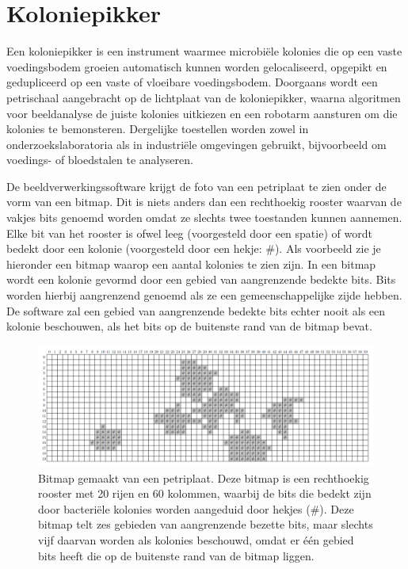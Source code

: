 
\section*{Koloniepikker}
Een koloniepikker is een instrument waarmee microbiële kolonies die op een vaste
voedingsbodem groeien automatisch kunnen worden gelocaliseerd, opgepikt en
gedupliceerd op een vaste of vloeibare voedingsbodem. Doorgaans wordt een
petrischaal aangebracht op de lichtplaat van de koloniepikker, waarna algoritmen
voor beeldanalyse de juiste kolonies uitkiezen en een robotarm aansturen om die
kolonies te bemonsteren. Dergelijke toestellen worden zowel in
onderzoekslaboratoria als in industri\"ele omgevingen gebruikt, bijvoorbeeld om
voedings- of bloedstalen te analyseren.

De beeldverwerkingssoftware krijgt de foto van een petriplaat te zien onder de
vorm van een bitmap. Dit is niets anders dan een rechthoekig rooster waarvan de
vakjes bits genoemd worden omdat ze slechts twee toestanden kunnen aannemen.
Elke bit van het rooster is ofwel leeg (voorgesteld door een spatie) of wordt
bedekt door een kolonie (voorgesteld door een hekje: \#). Als voorbeeld zie je
hieronder een bitmap waarop een aantal kolonies te zien zijn. In een bitmap
wordt een kolonie gevormd door een gebied van aangrenzende bedekte bits. Bits
worden hierbij aangrenzend genoemd als ze een gemeenschappelijke zijde hebben.
De software zal een gebied van aangrenzende bedekte bits echter nooit als een
kolonie beschouwen, als het bits op de buitenste rand van de bitmap bevat.

\begin{figure}[H]
  \begin{center}
    \centerline{\includegraphics[scale=0.30]{koloniepikker/colony_bitmap.png}}
    \caption{Bitmap gemaakt van een petriplaat. Deze bitmap is een rechthoekig
        rooster met 20 rijen en 60 kolommen, waarbij de bits die bedekt zijn
        door bacteri\"ele kolonies worden aangeduid door hekjes (\#). Deze
        bitmap telt zes gebieden van aangrenzende bezette bits, maar slechts
        vijf daarvan worden als kolonies beschouwd, omdat er \'e\'en gebied bits
        heeft die op de buitenste rand van de bitmap liggen.}
  \end{center}
\end{figure}

